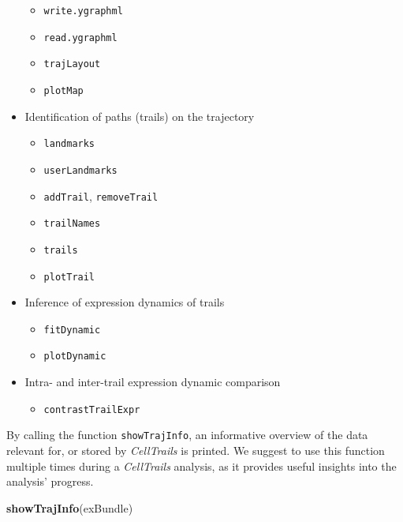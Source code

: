 \documentclass[]{book}
\newenvironment{Shaded}{\begin{snugshade}}{\end{snugshade}}
\newcommand{\KeywordTok}[1]{\textcolor[rgb]{0.13,0.29,0.53}{\textbf{#1}}}
\newcommand{\NormalTok}[1]{#1}
\providecommand{\tightlist}{%
  \setlength{\itemsep}{0pt}\setlength{\parskip}{0pt}}
\theoremstyle{definition}
\theoremstyle{definition}
\theoremstyle{definition}
\theoremstyle{remark}
\begin{document}
\begin{itemize}
  \begin{itemize}
  \tightlist
  \item
    \texttt{write.ygraphml}
  \item
    \texttt{read.ygraphml}
  \item
    \texttt{trajLayout}
  \item
    \texttt{plotMap}
  \end{itemize}
\item
  Identification of paths (trails) on the trajectory

  \begin{itemize}
  \tightlist
  \item
    \texttt{landmarks}
  \item
    \texttt{userLandmarks}
  \item
    \texttt{addTrail}, \texttt{removeTrail}
  \item
    \texttt{trailNames}
  \item
    \texttt{trails}
  \item
    \texttt{plotTrail}
  \end{itemize}
\item
  Inference of expression dynamics of trails

  \begin{itemize}
  \tightlist
  \item
    \texttt{fitDynamic}
  \item
    \texttt{plotDynamic}
  \end{itemize}
\item
  Intra- and inter-trail expression dynamic comparison

  \begin{itemize}
  \tightlist
  \item
    \texttt{contrastTrailExpr}
  \end{itemize}
\end{itemize}

By calling the function \texttt{showTrajInfo}, an informative overview
of the data relevant for, or stored by \emph{CellTrails} is printed. We
suggest to use this function multiple times during a \emph{CellTrails}
analysis, as it provides useful insights into the analysis' progress.

\begin{Shaded}
\begin{Highlighting}[]
\KeywordTok{showTrajInfo}\NormalTok{(exBundle)}
\end{Highlighting}
\end{Shaded}
\end{document}
